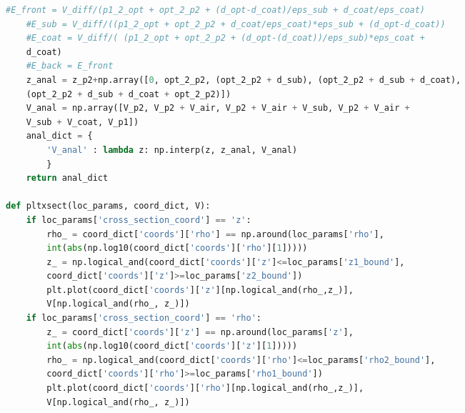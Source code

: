 \begin{spacing}{1.2}
\begin{lstlisting}[frame=single, language=Python]
    #E_front = V_diff/(p1_2_opt + opt_2_p2 + (d_opt-d_coat)/eps_sub + d_coat/eps_coat)
    #E_sub = V_diff/((p1_2_opt + opt_2_p2 + d_coat/eps_coat)*eps_sub + (d_opt-d_coat))
    #E_coat = V_diff/( (p1_2_opt + opt_2_p2 + (d_opt-(d_coat))/eps_sub)*eps_coat + 
	d_coat)
    #E_back = E_front
    z_anal = z_p2+np.array([0, opt_2_p2, (opt_2_p2 + d_sub), (opt_2_p2 + d_sub + d_coat),
	(opt_2_p2 + d_sub + d_coat + opt_2_p2)])
    V_anal = np.array([V_p2, V_p2 + V_air, V_p2 + V_air + V_sub, V_p2 + V_air + 
	V_sub + V_coat, V_p1])
    anal_dict = {
        'V_anal' : lambda z: np.interp(z, z_anal, V_anal)
        }
    return anal_dict

def pltxsect(loc_params, coord_dict, V): 
    if loc_params['cross_section_coord'] == 'z':
        rho_ = coord_dict['coords']['rho'] == np.around(loc_params['rho'], 
	    int(abs(np.log10(coord_dict['coords']['rho'][1]))))
        z_ = np.logical_and(coord_dict['coords']['z']<=loc_params['z1_bound'], 
	    coord_dict['coords']['z']>=loc_params['z2_bound'])
        plt.plot(coord_dict['coords']['z'][np.logical_and(rho_,z_)],
	    V[np.logical_and(rho_, z_)])
    if loc_params['cross_section_coord'] == 'rho':
        z_ = coord_dict['coords']['z'] == np.around(loc_params['z'], 
	    int(abs(np.log10(coord_dict['coords']['z'][1]))))
        rho_ = np.logical_and(coord_dict['coords']['rho']<=loc_params['rho2_bound'], 
	    coord_dict['coords']['rho']>=loc_params['rho1_bound'])
        plt.plot(coord_dict['coords']['rho'][np.logical_and(rho_,z_)],
	    V[np.logical_and(rho_, z_)])
\end{lstlisting}
\end{spacing}
